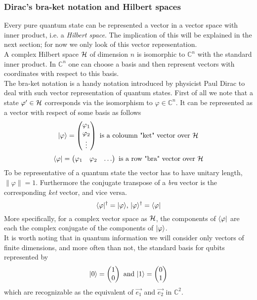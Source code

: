 	\subsubsection*{Dirac's bra-ket notation and Hilbert spaces}
	Every pure quantum state can be represented a vector in a vector space with inner product, i.e. a \emph{Hilbert space}. 
	The implication of this will be explained in the next section; for now we only look of this vector representation.\\
	 A complex Hilbert space $\mathcal{H}$ of dimension $n$ is isomorphic to $ \mathbb{C}^n $ with the standard inner product. 
	 In $\mathbb{C}^n $ one can choose a basis and then represent vectors with coordinates with respect to this basis.\\
	The bra-ket notation is a handy notation introduced by physicist Paul Dirac to deal with such vector representation of quantum states. 
	First of all we note that a state $\varphi '\in\mathcal{H}$ corresponds via the isomorphism to $ \varphi  \in \mathbb{C}^n $. It can be represented as a vector with respect of some basis as follows
	$$|\varphi \rangle = \begin{pmatrix} \varphi_1 \\ \varphi_2 \\ \vdots \end{pmatrix}	  \text{  is a coloumn "ket" vector over } \mathcal{H} $$
	$$\langle \varphi|  = \begin{pmatrix} \varphi_1 & \varphi_2 & \hdots \end{pmatrix} \text{  is a row "bra" vector over } \mathcal{H} $$
	To be representative of a quantum state the vector has to have unitary length, $\|\varphi\|= 1$.
	Furthermore the conjugate transpose of a \emph{bra} vector is the corresponding \emph{ket} vector, and vice versa.
	$$ \langle \varphi|^{\dagger} = |\varphi \rangle \text{,    } |\varphi \rangle^{\dagger} = \langle \varphi|$$
	More specifically, for a complex vector space as $\mathcal{H}$, the components of $\langle \varphi|$ are each the complex conjugate of the components of $|\varphi \rangle$.\\
	It is worth noting that in quantum information we will consider only vectors of finite dimensions, and more often than not, the standard basis for qubits represented by
	$$|0 \rangle =  \begin{pmatrix} 1 \\ 0 \end{pmatrix}
	\text{ and }
	|1 \rangle =  \begin{pmatrix} 0 \\ 1 \end{pmatrix}$$
	which are recognizable as the equivalent of $\vec{e_1}$ and $\vec{e_2}$ in $\mathbb{C}^2$.\\
	

